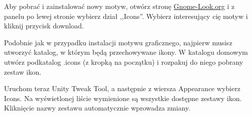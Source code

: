 Aby pobrać i zainstalować nowy motyw, otwórz stronę \href{http://gnome-look.org/}{Gnome-Look.org} i z panelu po lewej stronie wybierz dział ,,Icons''. Wybierz interesujący cię motyw i kliknij przycisk \textcolor{ubuntu_orange}{download}.

Podobnie jak w przypadku instalacji motywu graficznego, najpierw musisz utworzyć katalog, w którym będą przechowywane ikony. W katalogu domowym utwórz podkatalog .icons (z kropką na początku) i rozpakuj do niego pobrany zestaw ikon.

Uruchom teraz \textcolor{ubuntu_orange}{Unity Tweak Tool}, a następnie z wiersza \textcolor{ubuntu_orange}{Appearance} wybierz \textcolor{ubuntu_orange}{Icons}. Na wyświetlonej liście wymienione są wszystkie dostępne zestawy ikon. Kliknięcie nazwy zestawu automatycznie wprowadza zmiany.
